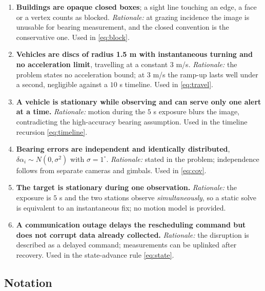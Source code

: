 \documentclass[12pt]{article}
\begin{document}
\begin{enumerate}[leftmargin=2em]
  \item \textbf{Buildings are opaque closed boxes}; a sight line touching an edge, a face or a vertex counts as blocked. \emph{Rationale:} at grazing incidence the image is unusable for bearing measurement, and the closed convention is the conservative one. Used in \eqref{eq:block}.
  \item \textbf{Vehicles are discs of radius 1.5 m with instantaneous turning and no acceleration limit}, travelling at a constant $3$ m/s. \emph{Rationale:} the problem states no acceleration bound; at $3$ m/s the ramp-up lasts well under a second, negligible against a $10$ s timeline. Used in \eqref{eq:travel}.
  \item \textbf{A vehicle is stationary while observing and can serve only one alert at a time.} \emph{Rationale:} motion during the $5$ s exposure blurs the image, contradicting the high-accuracy bearing assumption. Used in the timeline recursion \eqref{eq:timeline}.
  \item \textbf{Bearing errors are independent and identically distributed}, $\delta\alpha_i\sim N(0,\sigma^2)$ with $\sigma=1^\circ$. \emph{Rationale:} stated in the problem; independence follows from separate cameras and gimbals. Used in \eqref{eq:cov}.
  \item \textbf{The target is stationary during one observation.} \emph{Rationale:} the exposure is $5$ s and the two stations observe \emph{simultaneously}, so a static solve is equivalent to an instantaneous fix; no motion model is provided.
  \item \textbf{A communication outage delays the rescheduling command but does not corrupt data already collected.} \emph{Rationale:} the disruption is described as a delayed command; measurements can be uplinked after recovery. Used in the state-advance rule \eqref{eq:state}.
\end{enumerate}

\subsection{Notation}
\end{document}
